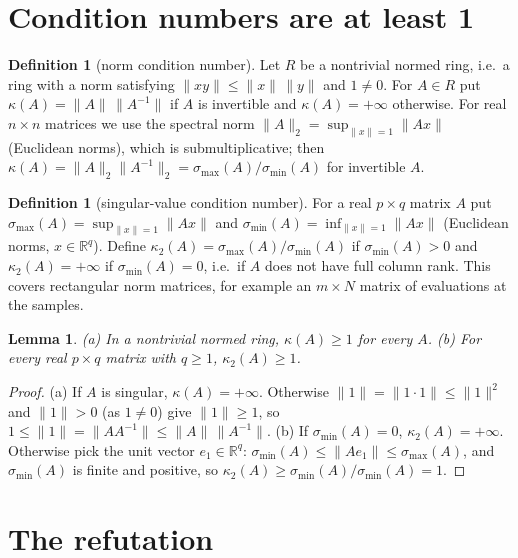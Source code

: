 \documentclass[11pt]{article}
\renewcommand{\_}{\oldus\allowbreak}
\newtheorem{lemma}[theorem]{Lemma}
\theoremstyle{definition}
\newtheorem{definition}[theorem]{Definition}
\theoremstyle{remark}
\begin{document}
\section{Condition numbers are at least 1}

\begin{definition}[norm condition number]
Let $R$ be a nontrivial normed ring, i.e.\ a ring with a norm satisfying
$\|xy\|\le\|x\|\,\|y\|$ and $1\ne 0$. For $A\in R$ put $\kappa(A)=\|A\|\,\|A^{-1}\|$ if $A$ is invertible
and $\kappa(A)=+\infty$ otherwise. For real $n\times n$ matrices we use the spectral norm
$\|A\|_2=\sup_{\|x\|=1}\|Ax\|$ (Euclidean norms), which is submultiplicative; then
$\kappa(A)=\|A\|_2\|A^{-1}\|_2=\sigma_{\max}(A)/\sigma_{\min}(A)$ for invertible $A$.
\end{definition}

\begin{definition}[singular-value condition number]
For a real $p\times q$ matrix $A$ put $\sigma_{\max}(A)=\sup_{\|x\|=1}\|Ax\|$ and
$\sigma_{\min}(A)=\inf_{\|x\|=1}\|Ax\|$ (Euclidean norms, $x\in\mathbb{R}^q$). Define
$\kappa_2(A)=\sigma_{\max}(A)/\sigma_{\min}(A)$ if $\sigma_{\min}(A)>0$ and $\kappa_2(A)=+\infty$ if
$\sigma_{\min}(A)=0$, i.e.\ if $A$ does not have full column rank. This covers rectangular norm matrices,
for example an $m\times N$ matrix of evaluations at the samples.
\end{definition}

\begin{lemma}\label{lem:ge1}
(a) In a nontrivial normed ring, $\kappa(A)\ge 1$ for every $A$.
(b) For every real $p\times q$ matrix with $q\ge1$, $\kappa_2(A)\ge1$.
\end{lemma}

\begin{proof}
(a) If $A$ is singular, $\kappa(A)=+\infty$. Otherwise $\|1\|=\|1\cdot 1\|\le\|1\|^2$ and $\|1\|>0$ (as
$1\ne0$) give $\|1\|\ge1$, so $1\le\|1\|=\|AA^{-1}\|\le\|A\|\,\|A^{-1}\|$.
(b) If $\sigma_{\min}(A)=0$, $\kappa_2(A)=+\infty$. Otherwise pick the unit vector $e_1\in\mathbb{R}^q$:
$\sigma_{\min}(A)\le\|Ae_1\|\le\sigma_{\max}(A)$, and $\sigma_{\min}(A)$ is finite and positive, so
$\kappa_2(A)\ge\sigma_{\min}(A)/\sigma_{\min}(A)=1$.
\end{proof}

\section{The refutation}
\end{document}
